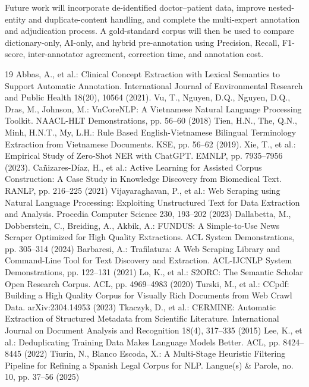 \documentclass[runningheads]{llncs}
\begin{document}
Future work will incorporate de-identified doctor--patient data, improve nested-entity and duplicate-content handling, and complete the multi-expert annotation and adjudication process. A gold-standard corpus will then be used to compare dictionary-only, AI-only, and hybrid pre-annotation using Precision, Recall, F1-score, inter-annotator agreement, correction time, and annotation cost.


\begin{thebibliography}{19}
 Abbas, A., et al.: Clinical Concept Extraction with Lexical Semantics to Support Automatic Annotation. International Journal of Environmental Research and Public Health 18(20), 10564 (2021). 
 Vu, T., Nguyen, D.Q., Nguyen, D.Q., Dras, M., Johnson, M.: VnCoreNLP: A Vietnamese Natural Language Processing Toolkit. NAACL-HLT Demonstrations, pp. 56--60 (2018)
 Tien, H.N., The, Q.N., Minh, H.N.T., My, L.H.: Rule Based English-Vietnamese Bilingual Terminology Extraction from Vietnamese Documents. KSE, pp. 56--62 (2019). 
 Xie, T., et al.: Empirical Study of Zero-Shot NER with ChatGPT. EMNLP, pp. 7935--7956 (2023). 
 Cañizares-Díaz, H., et al.: Active Learning for Assisted Corpus Construction: A Case Study in Knowledge Discovery from Biomedical Text. RANLP, pp. 216--225 (2021)
 Vijayaraghavan, P., et al.: Web Scraping using Natural Language Processing: Exploiting Unstructured Text for Data Extraction and Analysis. Procedia Computer Science 230, 193--202 (2023)
 Dallabetta, M., Dobberstein, C., Breiding, A., Akbik, A.: FUNDUS: A Simple-to-Use News Scraper Optimized for High Quality Extractions. ACL System Demonstrations, pp. 305--314 (2024)
 Barbaresi, A.: Trafilatura: A Web Scraping Library and Command-Line Tool for Text Discovery and Extraction. ACL-IJCNLP System Demonstrations, pp. 122--131 (2021)
 Lo, K., et al.: S2ORC: The Semantic Scholar Open Research Corpus. ACL, pp. 4969--4983 (2020)
 Turski, M., et al.: CCpdf: Building a High Quality Corpus for Visually Rich Documents from Web Crawl Data. arXiv:2304.14953 (2023)
 Tkaczyk, D., et al.: CERMINE: Automatic Extraction of Structured Metadata from Scientific Literature. International Journal on Document Analysis and Recognition 18(4), 317--335 (2015)
 Lee, K., et al.: Deduplicating Training Data Makes Language Models Better. ACL, pp. 8424--8445 (2022)
 Tiurin, N., Blanco Escoda, X.: A Multi-Stage Heuristic Filtering Pipeline for Refining a Spanish Legal Corpus for NLP. Langue(s) \& Parole, no. 10, pp. 37--56 (2025)

\end{thebibliography}
\end{document}
